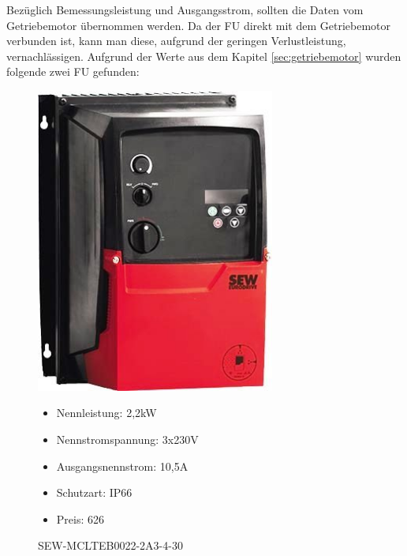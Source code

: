 Bezüglich Bemessungsleistung und Ausgangsstrom, sollten die Daten vom Getriebemotor übernommen werden. Da der \ac{FU} direkt mit dem Getriebemotor verbunden ist, kann man diese, aufgrund der geringen Verlustleistung, vernachlässigen. Aufgrund der Werte aus dem Kapitel \ref{sec:getriebemotor} wurden folgende zwei \ac{FU} gefunden:
\newpage

\begin{figure}[H]
\begin{minipage}[t]{0.45\textwidth}
\includegraphics[width=0.70\textwidth]{fig/SEWFU}
\caption{SEW-MCLTEB0022-2A3-4-30}

\begin{itemize}
	\item{Nennleistung: 2,2kW}
	\item{Nennstromspannung: 3x230V}
	\item{Ausgangsnennstrom: 10,5A}
	\item{Schutzart: IP66}
	\item{Preis: 626\textsf{\texteuro} \cite{preisFUSEW}}
\end{itemize}

\end{minipage}
\hspace{0.1\textwidth}
\begin{minipage}[t]{0.45\textwidth}


\end{minipage}
\end{figure}
